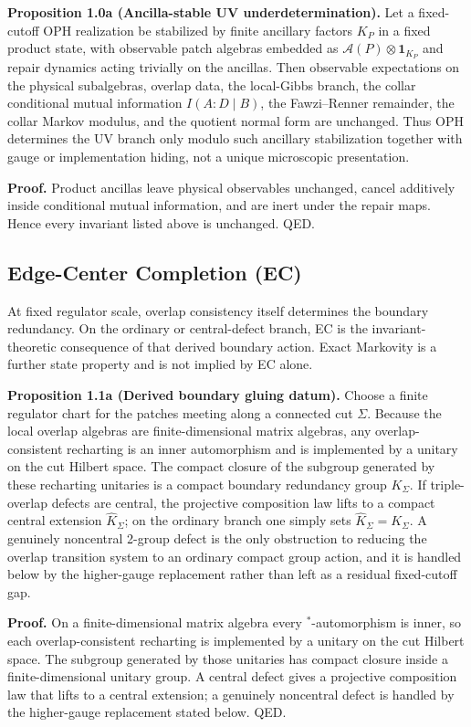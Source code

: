 \textbf{Proposition 1.0a (Ancilla-stable UV underdetermination).} Let a fixed-cutoff OPH realization be stabilized by finite ancillary factors \(K_P\) in a fixed product state, with observable patch algebras embedded as \(\mathcal A(P)\otimes \mathbf 1_{K_P}\) and repair dynamics acting trivially on the ancillas. Then observable expectations on the physical subalgebras, overlap data, the local-Gibbs branch, the collar conditional mutual information \(I(A:D\mid B)\), the Fawzi--Renner remainder, the collar Markov modulus, and the quotient normal form are unchanged. Thus OPH determines the UV branch only modulo such ancillary stabilization together with gauge or implementation hiding, not a unique microscopic presentation.

\textbf{Proof.} Product ancillas leave physical observables unchanged, cancel additively inside conditional mutual information, and are inert under the repair maps. Hence every invariant listed above is unchanged. QED.

\subsection{Edge-Center Completion (EC)}\label{13-edge-center-completion-ec}

At fixed regulator scale, overlap consistency itself determines the boundary redundancy. On the
ordinary or central-defect branch, EC is the invariant-theoretic consequence of that derived
boundary action. Exact Markovity is a further state property and is not implied by EC alone.

\textbf{Proposition 1.1a (Derived boundary gluing datum).} Choose a finite regulator chart for the patches meeting along a connected cut \(\Sigma\). Because the local overlap algebras are finite-dimensional matrix algebras, any overlap-consistent recharting is an inner automorphism and is implemented by a unitary on the cut Hilbert space. The compact closure of the subgroup generated by these recharting unitaries is a compact boundary redundancy group \(K_\Sigma\). If triple-overlap defects are central, the projective composition law lifts to a compact central extension \(\widehat K_\Sigma\); on the ordinary branch one simply sets \(\widehat K_\Sigma = K_\Sigma\). A genuinely noncentral 2-group defect is the only obstruction to reducing the overlap transition system to an ordinary compact group action, and it is handled below by the higher-gauge replacement rather than left as a residual fixed-cutoff gap.

\textbf{Proof.} On a finite-dimensional matrix algebra every \(^*\)-automorphism is inner, so each overlap-consistent recharting is implemented by a unitary on the cut Hilbert space. The subgroup generated by those unitaries has compact closure inside a finite-dimensional unitary group. A central defect gives a projective composition law that lifts to a central extension; a genuinely noncentral defect is handled by the higher-gauge replacement stated below. QED.

